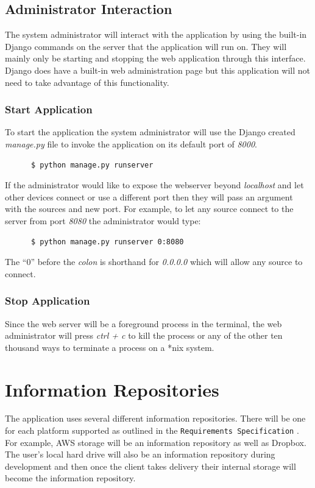 \documentclass{article}
\begin{document}
    \subsection{Administrator Interaction}
    The system administrator will interact with the application by using the built-in Django commands on the
    server that the application will run on. They will mainly only be starting and stopping the web application
    through this interface. Django does have a built-in web administration page but this application will not
    need to take advantage of this functionality.

      \subsubsection{Start Application}
      To start the application the system administrator will use the Django created \textit{manage.py} file
      to invoke the application on its default port of \textit{8000}.
      \begin{verbatim}
      $ python manage.py runserver
      \end{verbatim}

      If the administrator would like to expose the webserver beyond \textit{localhost} and let other devices connect or
      use a different port then they will pass an argument with the sources and new port. For example, to let any source
      connect to the server from port \textit{8080} the administrator would type:
      \begin{verbatim}
      $ python manage.py runserver 0:8080
      \end{verbatim}
      The ``0'' before the \textit{colon} is shorthand for \textit{0.0.0.0} which will allow any source to connect.

      \subsubsection{Stop Application}
      Since the web server will be a foreground process in the terminal, the web administrator will press \textit{ctrl + c}
      to kill the process or any of the other ten thousand ways to terminate a process on a *nix system.

\section{Information Repositories}
The application uses several different information repositories. There will be one for each platform supported as
outlined in the \texttt{Requirements Specification} \cite{reqs}. For example, AWS storage will be an information
repository as well as Dropbox. The user's local hard drive will also be an information repository during
development and then once the client takes delivery their internal storage will become the information repository.
\end{document}
